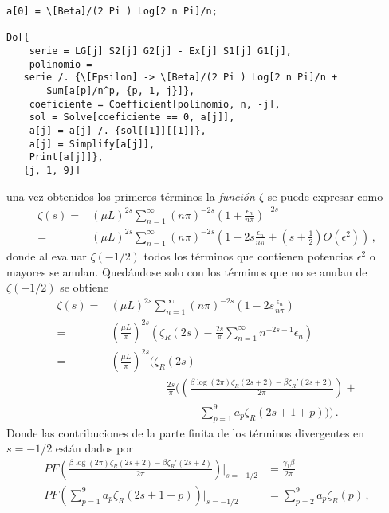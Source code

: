 \begin{verbatim}
a[0] = \[Beta]/(2 Pi ) Log[2 n Pi]/n;

Do[{
  	serie = LG[j] S2[j] G2[j] - Ex[j] S1[j] G1[j],
  	polinomio = 
   serie /. {\[Epsilon] -> \[Beta]/(2 Pi ) Log[2 n Pi]/n + 
       Sum[a[p]/n^p, {p, 1, j}]},
  	coeficiente = Coefficient[polinomio, n, -j],
  	sol = Solve[coeficiente == 0, a[j]],
  	a[j] = a[j] /. {sol[[1]][[1]]},
  	a[j] = Simplify[a[j]],
  	Print[a[j]]},
   {j, 1, 9}]
\end{verbatim}
una vez obtenidos los primeros términos la {\it función-$\zeta$} se puede expresar como
\begin{equation}
\begin{aligned}
\zeta (s) =& 
( \mu L ) ^{2s}
\sum _{n=1} ^{\infty}
( n \pi) ^{-2s} \left( 1 + \frac{ \epsilon _n }{n \pi } \right) ^{-2s } \\
 =& 
(\mu L) ^{2s} \sum _{n=1} ^{\infty}
( n \pi) ^{-2s} \left(
						1 -2s  \frac{\epsilon _n}{n \pi} + 
						\left( s + \frac{1}{2} \right) O( \epsilon ^2 )
						\right)
\, ,
\end{aligned}
\end{equation}
donde al evaluar $\zeta (-1/2)$ todos los términos que contienen potencias $\epsilon ^2$ o mayores se anulan. Quedándose solo con los términos que no se anulan de $\zeta (-1/2)$ se obtiene
\begin{equation}
\begin{aligned}
\zeta (s) =& (\mu L) ^{2s} \sum _{n=1} ^{\infty} 
	(n \pi ) ^{-2s}
		\left(
				1 - 2s \frac{\epsilon _n}{n \pi } 
				\right) \\
		=& \left( \frac{\mu L}{\pi} \right) ^{2s}
				\left(
						\zeta _R (2s) - 
						\frac{2 s}{\pi } \sum _{n=1} ^{\infty} 
						n ^{-2s-1} \epsilon _n
						\right)
\\
		=& \left( \frac{\mu L }{\pi} \right) ^{2s}
			\Bigg(
						\zeta _R (2s) - \\ 
						& \qquad \qquad \quad
						\frac{2 s}{\pi }  \Bigg( \left(
							\frac{\beta \log (2 \pi) \zeta _R (2s+2) -
							\beta \zeta _R ' (2s+2)}{2 \pi }
								\right) + \\
								& \qquad \qquad \qquad \qquad 
								\sum _{p=1} ^{9} 
							a _p \zeta _R (2s+1+p)
								\Bigg) \Bigg) \, .
\end{aligned}
\end{equation}
Donde las contribuciones de la parte finita de los términos divergentes en $s=-1/2$ están dados por
\begin{align}\label{cortar}
PF \left(
	\frac{\beta \log (2 \pi) \zeta _R (2s+2) -
	\beta \zeta _R ' (2s+2)}{2 \pi } 
		\right) \Bigg| _{s=-1/2}
	&= 
	  \frac{ \gamma _1 \beta}{2 \pi }  \\
PF \left( 
		\sum _{p=1} ^{9} a _p \zeta _R (2s+1+p)
		\right) \Bigg| _{s=-1/2 }
	&= \sum _{p=2} ^{9} a _p \zeta _R (p)
	\, ,
\end{align}
